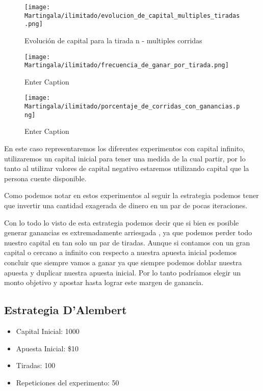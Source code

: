 \documentclass{article}
\begin{document}
\begin{figure}
    
\end{figure}
 \begin{figure}
     \centering
     \texttt{[image: Martingala/ilimitado/evolucion\_de\_capital\_multiples\_tiradas.png]}
     \caption{Evolución de capital para la tirada n - multiples corridas}
     \label{fig:enter-label}
 \end{figure}
\clearpage
\begin{figure}
    \centering
    \texttt{[image: Martingala/ilimitado/frecuencia\_de\_ganar\_por\_tirada.png]}
    \caption{Enter Caption}
    \label{fig:enter-label}
\end{figure}
 \begin{figure}
     \centering
     \texttt{[image: Martingala/ilimitado/porcentaje\_de\_corridas\_con\_ganancias.png]}
     \caption{Enter Caption}
     \label{fig:enter-label}
 \end{figure}
\clearpage
En este caso representaremos los diferentes experimentos con capital infinito, utilizaremos un capital inicial para tener una medida de la cual partir, por lo tanto al utilizar valores de capital negativo estaremos utilizando capital que la persona cuente disponible.

Como podemos notar en estos experimentos al seguir la estrategia podemos tener que invertir una cantidad exagerada de dinero en un par de pocas iteraciones.

Con lo todo lo visto de esta estrategia podemos decir que si bien es posible generar ganancias es extremadamente arriesgada , ya que podemos perder todo nuestro capital en tan solo un par de tiradas. Aunque si contamos con un gran capital o cercano a infinito con respecto a nuestra apuesta inicial podemos concluir que siempre vamos a ganar ya
que siempre podemos doblar nuestra apuesta y duplicar nuestra apuesta inicial. Por lo tanto podríamos elegir un monto objetivo y apostar hasta lograr este margen de ganancia.

 \clearpage
\subsection{Estrategia D’Alembert}

\begin{itemize}
\item Capital Inicial: 1000
\item Apuesta Inicial: \$10
\item Tiradas: 100
\item Repeticiones del experimento: 50
\end{itemize}
\end{document}
